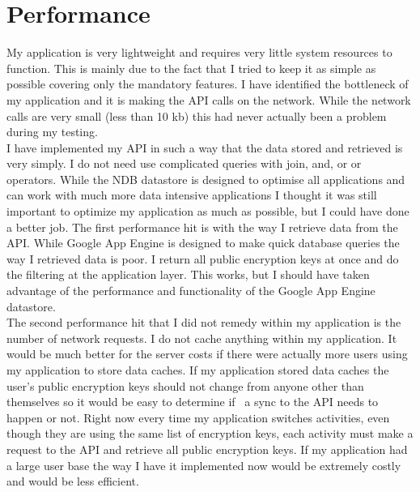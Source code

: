 \documentclass[letterpaper,12pt,notitlepage,fleqn]{article}
\begin{document}
\section{Performance}
\indent My application is very lightweight and requires very little system resources to function. This is mainly due to the fact that I tried to keep it as simple as possible covering only the mandatory features. I have identified the bottleneck of my application and it is making the API calls on the network. While the network calls are very small (less than 10 kb) this had never actually been a problem during my testing. 
\\
\indent I have implemented my API in such a way that the data stored and retrieved is very simply. I do not need use complicated queries with join, and, or or operators. While the NDB datastore is designed to optimise all applications and can work with much more data intensive applications I thought it was still important to optimize my application as much as possible, but I could have done a better job. The first performance hit is with the way I retrieve data from the API. While
Google App Engine is designed to make quick database queries the way I retrieved data is poor. I return all public encryption keys at once and do the filtering at the application layer. This works, but I should have taken advantage of the performance and functionality of the Google App Engine datastore. 
\\
\indent The second performance hit that I did not remedy within my application is the number of network requests. I do not cache anything within my application. It would be much better for the server costs if there were actually more users using my application to store data caches. If my application stored data caches the user's public encryption keys should not change from anyone other than themselves so it would be easy to determine if  a sync to the API needs to happen or not. Right now every time
my application switches activities, even though they are using the same list of encryption keys, each activity must make a request to the API and retrieve all public encryption keys. If my application had a large user base the way I have it implemented now would be extremely costly and would be less efficient. 
\end{document}
